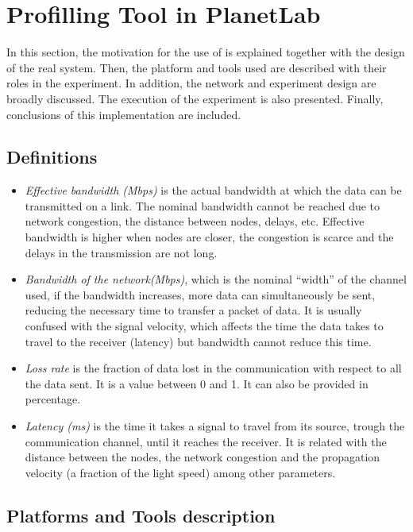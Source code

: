 
\section{Profilling Tool in PlanetLab}

In this section, the motivation for the use of \pl is explained together
with the design of the real system. Then, the platform and tools used are
described with their roles in the experiment. In addition, the network and
experiment design are broadly discussed. The execution of the experiment is also
presented. Finally, conclusions of this implementation are included.


\subsection{Definitions}
\begin{itemize}
\item\emph{Effective bandwidth (Mbps)} is the actual bandwidth at which the data
  can be transmitted on a link. The nominal bandwidth cannot be reached due to
  network congestion, the distance between nodes, delays, etc. Effective bandwidth is higher when nodes are closer, the congestion is scarce and the delays in the transmission are not long.
\item\emph{Bandwidth of the network(Mbps)}, which is the nominal ``width'' of the channel used, if the bandwidth increases, more data can simultaneously be sent, reducing the necessary time to transfer a packet of data. It is usually confused with the signal velocity, which affects the time the data takes to travel to the receiver (latency) but bandwidth cannot reduce this time.
\item\emph{Loss rate} is the fraction of data lost in the communication with respect
to all the data sent. It is a value between 0 and 1. It can also be provided in
percentage.

\item\emph{Latency (ms)} is the time it takes a signal to travel from its source, trough the communication channel, until it reaches the receiver. It is related with the distance between the nodes, the network congestion and the propagation velocity (a fraction of the light speed) among other parameters. 
\end{itemize}

\subsection{Platforms and Tools description}

